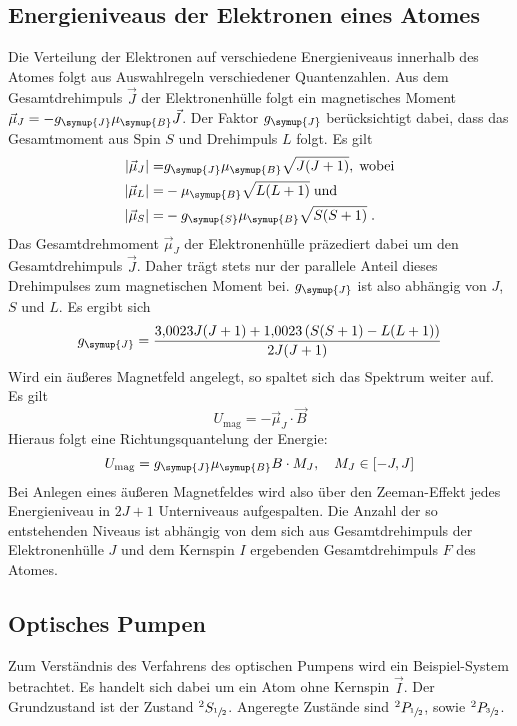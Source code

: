 \subsection{Energieniveaus der Elektronen eines Atomes}
%
Die Verteilung der Elektronen auf verschiedene Energieniveaus innerhalb des
Atomes folgt aus Auswahlregeln verschiedener Quantenzahlen. Aus dem
Gesamtdrehimpuls $\vec{J}$ der Elektronenhülle folgt ein magnetisches Moment
$\vec{\mu}_J=-g_{\symup{J}}\mu_{\symup{B}}\vec{J}$. Der Faktor $g_{\symup{J}}$
berücksichtigt dabei, dass das Gesamtmoment aus Spin $S$ und Drehimpuls $L$
folgt. Es gilt
%
\begin{align*}
  |\vec{\mu}_J|=&g_{\symup{J}}\mu_{\symup{B}}\sqrt{J(J+1)},\;\text{wobei} \\
  |\vec{\mu}_L|=&-\mu_{\symup{B}}\sqrt{L(L+1)}\;\text{und} \\
  |\vec{\mu}_S|=&-g_{\symup{S}}\mu_{\symup{B}}\sqrt{S(S+1)}\;.
\end{align*}
%
Das Gesamtdrehmoment $\vec{\mu}_J$ der Elektronenhülle präzediert dabei um den
Gesamtdrehimpuls $\vec{J}$. Daher trägt stets nur der parallele Anteil dieses
Drehimpulses zum magnetischen Moment bei. $g_{\symup{J}}$ ist also abhängig von
$J$, $S$ und $L$. Es ergibt sich
%
\begin{equation}
  g_{\symup{J}}=\frac{\num{3.0023}J(J+1)+\num{1.0023}\left(S(S+1)-L(L+1)\right)}{2J(J+1)}
  \label{eq:gj}
\end{equation}
%
Wird ein äußeres Magnetfeld angelegt, so spaltet sich das
Spektrum weiter auf. Es gilt
%
\begin{equation}
  U_\text{mag}=-\vec{\mu}_J\cdot\vec{B}
\end{equation}
%
Hieraus folgt eine Richtungsquantelung der Energie:
%
\begin{equation}
  U_\text{mag}=g_{\symup{J}}\mu_{\symup{B}}B\cdot M_J,\quad M_J\in[-J,J]
\end{equation}
%
Bei Anlegen eines äußeren Magnetfeldes wird also über den Zeeman-Effekt jedes
Energieniveau in $2J+1$ Unterniveaus aufgespalten. Die Anzahl der so
entstehenden Niveaus ist abhängig von dem sich aus Gesamtdrehimpuls der
Elektronenhülle $J$ und dem Kernspin $I$ ergebenden Gesamtdrehimpuls $F$ des
Atomes.
%


\subsection{Optisches Pumpen}
%
Zum Verständnis des Verfahrens des optischen Pumpens wird ein Beispiel-System
betrachtet. Es handelt sich dabei um ein Atom ohne Kernspin $\vec{I}$. Der
Grundzustand ist der Zustand $^2S_{\sfrac{1}{2}}$. Angeregte Zustände sind
$^2P_{\sfrac{1}{2}}$, sowie $^2P_{\sfrac{3}{2}}$.


